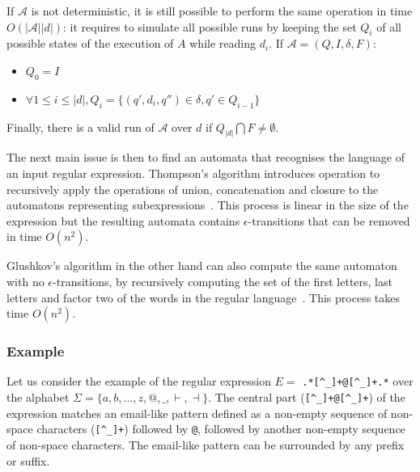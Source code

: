 \documentclass[12px]{article}
\begin{document}
        If $\mathcal{A}$ is not deterministic, it is still possible to perform
        the same operation in time $O(|\mathcal{A}| |d|)$: it requires to
        simulate all possible runs by keeping the set $Q_i$ of all possible
        states of the execution of $A$ while reading $d_i$. If $\mathcal{A} =
        (Q, I, \delta, F)$:
        \begin{itemize}
          \item $Q_0 = I$
          \item $\forall 1 \leq i \leq |d|, Q_i = \{(q', d_i, q'') \in \delta,
            q' \in Q_{i-1}\}$
        \end{itemize}
        Finally, there is a valid run of $\mathcal{A}$ over $d$ if $Q_{|d|}
        \bigcap F \neq \emptyset$.

        \vspace{0.5cm}

        The next main issue is then to find an automata that recognises the
        language of an input regular expression. Thompson's algorithm
        introduces operation to recursively apply the operations of union,
        concatenation and closure to the automatons representing
        subexpressions~\cite{thompson1968programming}. This process is linear
        in the size of the expression but the resulting automata contains
        $\epsilon$-transitions that can be removed in time $O(n^2)$.

        Glushkov's algorithm in the other hand can also compute the same
        automaton with no $\epsilon$-transitions, by recursively computing the
        set of the first letters, last letters and factor two of the words in
        the regular language~\cite{glushkov1961abstract}. This process takes
        time $O(n^2)$.

      \subsubsection{Example}%

        \label{sec:example_simple}

        Let us consider the example of the regular expression $E =$
        \texttt{.*[\textasciicircum\_]+@[\textasciicircum\_]+.*} over the
        alphabet $\Sigma = \{a, b, \ldots, z, @, \texttt \_, \vdash, \dashv\}$.
        The central part (\texttt{[\textasciicircum\_]+@[\textasciicircum\_]+})
        of the expression matches an email-like pattern defined as a non-empty
        sequence of non-space characters (\texttt{[\textasciicircum\_]+})
        followed by \texttt{@}, followed by another non-empty sequence of
        non-space characters. The email-like pattern can be surrounded by any
        prefix or suffix.
\end{document}
